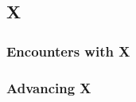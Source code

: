 \subsection{ X }

\begin{monsterdouble}
\nameleveldouble{}{}{}{}
\typedouble{}{}
\initsensesdouble{}{}{}{}
\speeddouble{}{}
\languagesdouble{}{}
\hpdouble{}{}
\acdouble{}{}
\savesdouble{}{}
\vulnerabilitiesdouble{}{}
\spacereachdouble{}{}{}{}
\stdattackdouble{}{}
\fullattackdouble{}{}
\optionsdouble{}{}
\babedgedouble{}{}{}{}
\feintdouble{}{}
\attributesdouble{}{}
\qualitiesdouble{}{}
\featsdouble{}{}
\skillsdouble{}{}
\abilitydouble{}
{}
\end{monsterdouble}

\subsubsection{Encounters with X }

\subsubsection{Advancing X }